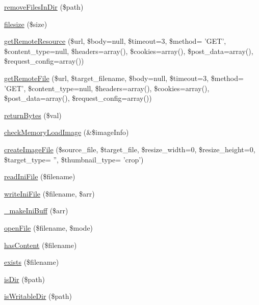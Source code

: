 \begin{DoxyCompactItemize}
\hyperlink{classFileHandler_a07839b4971e9ef40039d23ea65977d69}{remove\-Files\-In\-Dir} (\$path)
\item 
\hyperlink{classFileHandler_ae235b4ded589fb13caed260fabc0a30c}{filesize} (\$size)
\item 
\hyperlink{classFileHandler_a602c039b415c15d9d6866e586282faf7}{get\-Remote\-Resource} (\$url, \$body=null, \$timeout=3, \$method= 'G\-E\-T', \$content\-\_\-type=null, \$headers=array(), \$cookies=array(), \$post\-\_\-data=array(), \$request\-\_\-config=array())
\item 
\hyperlink{classFileHandler_a0e3720cacd0137d537834376ce7b982b}{get\-Remote\-File} (\$url, \$target\-\_\-filename, \$body=null, \$timeout=3, \$method= 'G\-E\-T', \$content\-\_\-type=null, \$headers=array(), \$cookies=array(), \$post\-\_\-data=array(), \$request\-\_\-config=array())
\item 
\hyperlink{classFileHandler_a79dd068137470965b560f4d23d978e7d}{return\-Bytes} (\$val)
\item 
\hyperlink{classFileHandler_a0b240e89b6ce57cb94e855fc25e5e9f3}{check\-Memory\-Load\-Image} (\&\$image\-Info)
\item 
\hyperlink{classFileHandler_a171948d79c14415ad45b7581a011c593}{create\-Image\-File} (\$source\-\_\-file, \$target\-\_\-file, \$resize\-\_\-width=0, \$resize\-\_\-height=0, \$target\-\_\-type= '', \$thumbnail\-\_\-type= 'crop')
\item 
\hyperlink{classFileHandler_a58a8bbae1ab4acb358599db38a47db4d}{read\-Ini\-File} (\$filename)
\item 
\hyperlink{classFileHandler_aa0fd9ce8f2c81bee472a403e75b578bd}{write\-Ini\-File} (\$filename, \$arr)
\item 
\hyperlink{classFileHandler_a8975f9247987757497e0288f3ee09173}{\-\_\-make\-Ini\-Buff} (\$arr)
\item 
\hyperlink{classFileHandler_a690753d8cf8ff837f28a811cdfbfa069}{open\-File} (\$filename, \$mode)
\item 
\hyperlink{classFileHandler_ad872016e83b1f62a03d54e359ce31f73}{has\-Content} (\$filename)
\item 
\hyperlink{classFileHandler_a862c4f6349792ae8f094ec456c9a26ed}{exists} (\$filename)
\item 
\hyperlink{classFileHandler_a5fd371542d6f1a86269d0b8795e74471}{is\-Dir} (\$path)
\item 
\hyperlink{classFileHandler_a9494e34a28f27b6a1ab2e032aada2bbb}{is\-Writable\-Dir} (\$path)
\end{DoxyCompactItemize}


